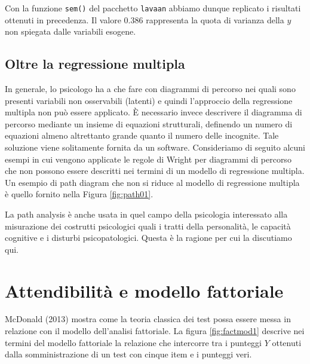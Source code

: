 \documentclass[
  11pt,
]{krantz}
\theoremstyle{definition}
\theoremstyle{definition}
\theoremstyle{definition}
\theoremstyle{definition}
\theoremstyle{remark}
\begin{document}
Con la funzione \texttt{sem()} del pacchetto \texttt{lavaan} abbiamo dunque replicato i risultati ottenuti in precedenza. Il valore \(0.386\) rappresenta la quota di varianza della \(y\) non spiegata dalle variabili esogene.

\hypertarget{oltre-la-regressione-multipla}{%
\section{Oltre la regressione multipla}\label{oltre-la-regressione-multipla}}

In generale, lo psicologo ha a che fare con diagrammi di percorso nei quali sono presenti variabili non osservabili (latenti) e quindi l'approccio della regressione multipla non può essere applicato. È necessario invece descrivere il diagramma di percorso mediante un insieme di equazioni strutturali, definendo un numero di equazioni almeno altrettanto grande quanto il numero delle incognite. Tale soluzione viene solitamente fornita da un software. Consideriamo di seguito alcuni esempi in cui vengono applicate le regole di Wright per diagrammi di percorso che non possono essere descritti nei termini di un modello di regressione multipla. Un esempio di path diagram che non si riduce al modello di regressione multipla è quello fornito nella Figura \ref{fig:path01}.

La path analysis è anche usata in quel campo della psicologia interessato alla misurazione dei costrutti psicologici quali i tratti della personalità, le capacità cognitive e i disturbi psicopatologici. Questa è la ragione per cui la discutiamo qui.

\hypertarget{ch:cronbach}{%
\chapter{Attendibilità e modello fattoriale}\label{ch:cronbach}}

McDonald (2013) mostra come la teoria classica dei test possa essere messa in relazione con il modello dell'analisi fattoriale. La figura \ref{fig:factmod1} descrive nei termini del modello fattoriale la relazione che intercorre tra i punteggi \(Y\) ottenuti dalla somministrazione di un test con cinque item e i punteggi veri.
\end{document}
